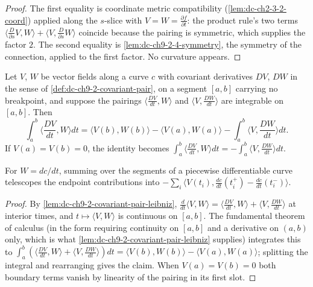 \begin{proof}
  \leanok
  \sketch
  The first equality is coordinate metric compatibility (\cref{lem:dc-ch2-3-2-coord})
  applied along the $s$-slice with $V=W=\frac{\partial f}{\partial t}$: the product rule's
  two terms $\langle\frac{D}{\partial s}V,W\rangle+\langle V,\frac{D}{\partial s}W\rangle$
  coincide because the pairing is symmetric, which supplies the factor $2$. The second
  equality is \cref{lem:dc-ch9-2-4-symmetry}, the symmetry of the connection, applied to
  the first factor. No curvature appears.
\end{proof}
\begin{lemma}
  \label{lem:dc-ch9-2-4-parts}
  \leanok
  Let $V$, $W$ be vector fields along a curve $c$ with covariant derivatives $DV$, $DW$
  in the sense of \cref{def:dc-ch9-2-covariant-pair}, on a segment $[a,b]$ carrying no
  breakpoint, and suppose the pairings $\langle\frac{DV}{dt},W\rangle$ and
  $\langle V,\frac{DW}{dt}\rangle$ are integrable on $[a,b]$. Then
  $$
  \int_a^b\Big\langle\frac{DV}{dt},W\Big\rangle dt
    = \langle V(b),W(b)\rangle-\langle V(a),W(a)\rangle
      -\int_a^b\Big\langle V,\frac{DW}{dt}\Big\rangle dt.
  $$
  If $V(a)=V(b)=0$, the identity becomes
  $\int_a^b\langle\frac{DV}{dt},W\rangle dt=-\int_a^b\langle V,\frac{DW}{dt}\rangle dt$.

  For $W=dc/dt$, summing over the segments of a piecewise differentiable curve
  telescopes the endpoint contributions into
  $-\sum_i\langle V(t_i),\frac{dc}{dt}(t_i^+)-\frac{dc}{dt}(t_i^-)\rangle$.
\end{lemma}
\begin{proof}
  \leanok
  \sketch
  By \cref{lem:dc-ch9-2-covariant-pair-leibniz}, $\frac{d}{dt}\langle V,W\rangle
  =\langle\frac{DV}{dt},W\rangle+\langle V,\frac{DW}{dt}\rangle$ at interior times, and
  $t\mapsto\langle V,W\rangle$ is continuous on $[a,b]$. The fundamental theorem of
  calculus (in the form requiring continuity on $[a,b]$ and a derivative on $(a,b)$ only,
  which is what \cref{lem:dc-ch9-2-covariant-pair-leibniz} supplies) integrates this to
  $\int_a^b(\langle\frac{DV}{dt},W\rangle+\langle V,\frac{DW}{dt}\rangle)dt
  =\langle V(b),W(b)\rangle-\langle V(a),W(a)\rangle$; splitting the integral and
  rearranging gives the claim. When $V(a)=V(b)=0$ both boundary terms vanish by linearity
  of the pairing in its first slot.
\end{proof}
